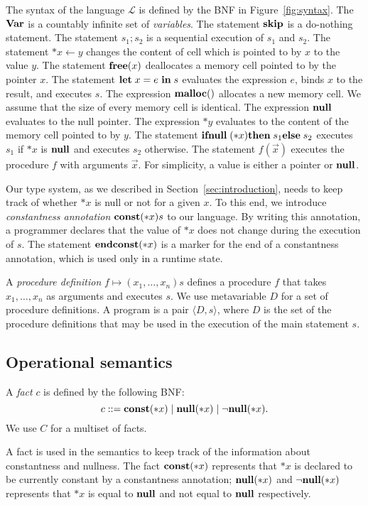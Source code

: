 
The syntax of the language \(\mathcal{L}\) is defined by the BNF in
Figure~\ref{fig:syntax}.  The \(\mathbf{Var}\) is a countably infinite set of
\emph{variables}. The statement \(\mathbf{skip}\) is a do-nothing statement.
The statement \(s_1;s_2\) is a sequential execution of \(s_1\) and
\(s_2\). The statement \(*x \leftarrow y\) changes the content of cell
which is pointed to by \(x\) to the value \(y\). The statement
\(\mathbf{free}(x)\) deallocates a memory cell pointed to by the pointer
\(x\). The statement \(\mathbf{let}\; x = e\ \mathbf{in}\; s\) evaluates the expression
\(e\), binds \(x\) to the result, and executes \(s\).  The expression
\(\mathbf{malloc}()\) allocates a new memory cell.  We assume that the size of
every memory cell is identical.  The expression \(\mathbf{null}\) evaluates to
the null pointer.  The expression $*y$ evaluates to the content of the
memory cell pointed to by \(y\).  The statement \(\mathbf{ifnull}\;(*x) \mathbf{then}\; s_1
\mathbf{else}\; s_2\) executes \(s_1\) if \(*x\) is \(\mathbf{null}\) and executes \(s_2\)
otherwise. The statement \(f(\vec{x})\) executes the procedure \(f\)
with arguments \(\vec{x}\).  For simplicity, a value is either a pointer
or $\mathbf{null}$.

Our type system, as we described in Section~\ref{sec:introduction},
needs to keep track of whether $*x$ is null or not for a given $x$.  To
this end, we introduce \emph{constantness annotation} \(\mathbf{const}(*x) s\)
to our language.  By writing this annotation, a programmer declares that
the value of $*x$ does not change during the execution of $s$.  The
statement \(\mathbf{endconst}(*x)\) is a marker for the end of a constantness
annotation, which is used only in a runtime state.

A \emph{procedure definition} $f \mapsto (x_1,\dots,x_n)s$ defines a
procedure $f$ that takes $x_1,\dots,x_n$ as arguments and executes $s$.
We use metavariable \(D\) for a set of procedure definitions.  A program
is a pair \(\langle D, s \rangle \), where \(D\) is the set of the
procedure definitions that may be used in the execution of the main
statement $s$.

\subsection{Operational semantics}
\label{sec:languageSemantics}

\begin{myDef}
 A \emph{fact} $c$ is defined by the following BNF:
 \[
 c ::= \mathbf{const}(*x) \mid \mathbf{null}(*x) \mid \neg\mathbf{null}(*x).
 \]
 We use $C$ for a multiset of facts.
\end{myDef}
A fact is used in the semantics to keep track of the information about
constantness and nullness.  The fact \(\mathbf{const}(*x)\) represents that $*x$
is declared to be currently constant by a constantness annotation;
\(\mathbf{null}(*x)\) and \(\neg\mathbf{null}(*x)\) represents that $*x$ is equal to $\mathbf{null}$ and
not equal to $\mathbf{null}$ respectively.


